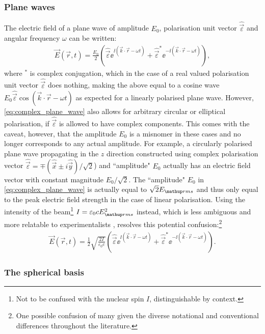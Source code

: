 \subsubsection{Plane waves}

The electric field of a plane wave of amplitude $E_0$, polarisation unit vector $\hat{\vec\varepsilon}$ and angular frequency $\omega$ can be written:
\begin{align}\label{eq:complex_plane_wave}
\vec E(\vec r, t) = \frac{E_0}2
\left(\hat{\vec\varepsilon} \ee^{\ii(\vec k \cdot \vec r - \omega t)}
+ \hat{\vec\varepsilon}^* \ee^{-\ii(\vec k \cdot \vec r - \omega t)} \right),
\end{align}
where $^*$ is complex conjugation, which in the case of a real valued polarisation unit vector $\hat{\vec\varepsilon}$ does nothing, making the above equal to a cosine wave $E_0\hat{\vec\varepsilon}\cos(\vec k \cdot \vec r - \omega t)$ as expected for a linearly polarised plane wave. However, \eqref{eq:complex_plane_wave} also allows for arbitrary circular or elliptical polarisation, if $\hat{\vec\varepsilon}$ is allowed to have complex components. This comes with the caveat, however, that the amplitude $E_0$ is a misnomer in these cases and no longer corresponds to any actual amplitude. For example, a circularly polarised plane wave propagating in the $z$ direction constructed using complex polarisation vector $\hat{\vec\varepsilon}=\mp(\hat{\vec{x}} \pm i \hat{\vec y})/\sqrt{2}$) and ``amplitude" $E_0$ actually has an electric field vector with constant magnitude $E_0/\sqrt{2}$. The ``amplitude" $E_0$ in \eqref{eq:complex_plane_wave} is actually equal to $\sqrt{2}E_\up{rms}$ and thus only equal to the peak electric field strength in the case of linear polarisation. Using the intensity of the beam\footnote{Not to be confused with the nuclear spin $I$, distinguishable by context.} $I=\varepsilon_0 c E_\up{rms}^2$ instead, which is less ambiguous and more relatable to experimentalists \cite{king_angular_2008}, resolves this potential confusion:\footnote{One possible confusion of many given the diverse notational and conventional differences throughout the literature.}
\begin{align}\label{eq:complex_plane_wave_intensity}
\vec E(\vec r, t) = \frac12\sqrt{\frac{2I}{\varepsilon_0 c}}
\left(\hat{\vec\varepsilon} \ee^{\ii(\vec k \cdot \vec r - \omega t)}
+ \hat{\vec\varepsilon}^* \ee^{-\ii(\vec k \cdot \vec r - \omega t)} \right).
\end{align}

\subsubsection{The spherical basis}

